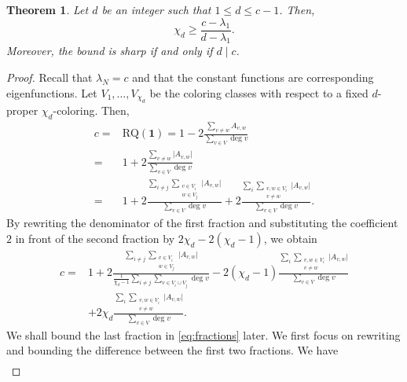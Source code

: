\documentclass{article}
\newcommand{\RQ}{\textrm{RQ}}
\theoremstyle{plain}
\newtheorem{theorem}{Theorem}[section]
\theoremstyle{definition}
\theoremstyle{remark}
\begin{document}
\begin{theorem}\label{thm:d-proper}
    Let $d$ be an integer such that $1\leq d\leq c-1$. Then,
    \[
    \chi_d \geq \frac{c-\lambda_1}{d-\lambda_1}.
    \]
    Moreover, the bound is sharp if and only if $d\mid c$.
\end{theorem}
\begin{proof}
    Recall that $\lambda_N=c$ and that the constant functions are corresponding eigenfunctions. Let $V_1,\ldots,V_{\chi_d}$ be the coloring classes with respect to a fixed $d$-proper $\chi_d$-coloring. Then,
    \begin{align*}
      \nonumber  c =& \RQ(\boldsymbol 1) = 1 - 2\frac{\sum_{v\neq w}A_{v,w}}{\sum_{v\in V}\deg v}\\
   \nonumber     =& 1 + 2\frac{\sum_{v\neq w}\bigl| A_{v,w}\bigr|}{\sum_{v\in V}\deg v}\\
    \nonumber    =& 1 + 2\frac{\sum_{i\neq j}\sum_{\substack{v\in V_i\\ w\in V_j}}\bigl| A_{v,w}\bigr|}{\sum_{v\in V}\deg v}+2\frac{\sum_i\sum_{\substack{v,w\in V_i\\ v\neq w}}\bigl| A_{v,w}\bigr|}{\sum_{v\in V}\deg v}.
    \end{align*}
    By rewriting the denominator of the first fraction and substituting the coefficient $2$ in front of the second fraction by $2\chi_d - 2(\chi_d - 1)$, we obtain %
    \begin{align}
     \nonumber c   =& 1 + 2\frac{\sum_{i\neq j}\sum_{\substack{v\in V_i\\ w\in V_j}}\bigl| A_{v,w}\bigr|}{\frac1{\chi_d-1}\sum_{i\neq j}\sum_{v\in V_i\cup V_j}\deg v} -2(\chi_d-1)\frac{\sum_i\sum_{\substack{v,w\in V_i\\ v\neq w}}\bigl| A_{v,w}\bigr|}{\sum_{v\in V}\deg v}\\
        &+2\chi_d\frac{\sum_i\sum_{\substack{v,w\in V_i\\ v\neq w}}\bigl| A_{v,w}\bigr|}{\sum_{v\in V}\deg v}.  \label{eq:fractions}
    \end{align}    
    We shall bound the last fraction in \eqref{eq:fractions} later. We first focus on rewriting and bounding the difference between the first two fractions. We have
    \begin{align*}

\end{align*}
\end{proof}
\end{document}
